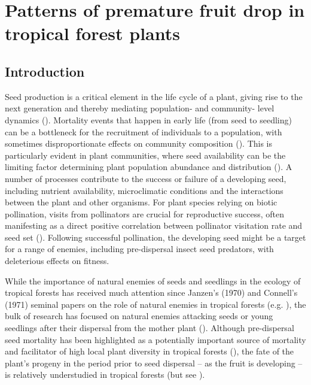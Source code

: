 \chapter{Patterns of premature fruit drop in tropical forest plants}

\section{Introduction}
Seed production is a critical element in the life cycle of a plant, giving rise to the next generation and thereby mediating population- and community- level dynamics (\cite{clarkArePlantPopulations2007a, maronHerbivoryEffectsPlant2006, turnbullArePlantPopulations2000, greenNonrandomDiversifyingProcesses2014}). Mortality events that happen in early life (from seed to seedling) can be a bottleneck for the recruitment of individuals to a population, with sometimes disproportionate effects on community composition (\cite{roughgardenRecruitmentDynamicsComplex1988}). This is particularly evident in plant communities, where seed availability can be the limiting factor determining plant population abundance and distribution (\cite{jamesDemographicProcessesLimiting2011,fennerEcologySeeds2005,rotherDemographicBottlenecksTropical2013}). A number of processes contribute to the success or failure of a developing seed, including nutrient availability, microclimatic conditions and the interactions between the plant and other organisms. For plant species relying on biotic pollination, visits from pollinators are crucial for reproductive success, often manifesting as a direct positive correlation between pollinator visitation rate and seed set (\cite{karronMultiplePollinatorVisits2006, steffan-dewenterPollinationSeedSet2001}). Following successful pollination, the developing seed might be a target for a range of enemies, including pre-dispersal insect seed predators, with deleterious effects on fitness. \par

While the importance of natural enemies of seeds and seedlings in the ecology of tropical forests has received much attention since Janzen’s (1970) and Connell’s (1971) seminal papers on the role of natural enemies in tropical forests (e.g. \cite{harmsPervasiveDensitydependentRecruitment2000, bagchiPathogensInsectHerbivores2014}), the bulk of research has focused on natural enemies attacking seeds or young seedlings after their dispersal from the mother plant (\cite{comitaTestingPredictionsJanzenConnell2014, hollEffectsSpeciesHabitat1997, leviTropicalForestsCan2019}). Although pre-dispersal seed mortality has been highlighted as a potentially important source of mortality and facilitator of high local plant diversity in tropical forests (\cite{ janzenHerbivoresNumberTree1970}), the fate of the plant’s progeny in the period prior to seed dispersal – as the fruit is developing – is relatively understudied in tropical forests (but see \cite{jonesDensitydependentPredispersalSeed2010}).

